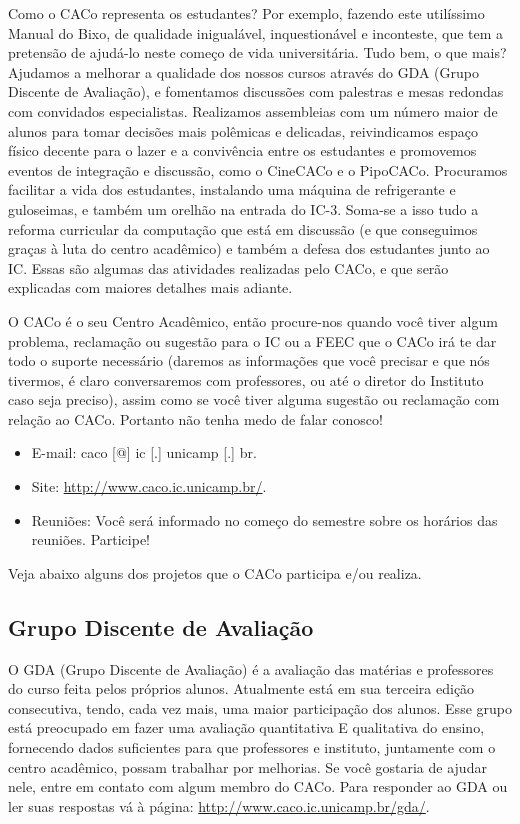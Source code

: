 Como o CACo representa os estudantes? Por exemplo, fazendo este utilíssimo
Manual do Bixo, de qualidade inigualável, inquestionável e inconteste, que tem
a pretensão de ajudá-lo neste começo de vida universitária. Tudo bem, o que
mais? Ajudamos a melhorar a qualidade dos nossos cursos através do GDA (Grupo
Discente de Avaliação), e fomentamos discussões com palestras e mesas redondas
com convidados especialistas. Realizamos assembleias com um número maior de
alunos para tomar decisões mais polêmicas e delicadas, reivindicamos espaço
físico decente para o lazer e a convivência entre os estudantes e promovemos
eventos de integração e discussão, como o CineCACo e o PipoCACo. Procuramos
facilitar a vida dos estudantes, instalando uma máquina de refrigerante
e guloseimas, e também um orelhão na entrada do IC-3. Soma-se a isso tudo
a reforma curricular da computação que está em discussão (e que conseguimos
graças à luta do centro acadêmico) e também a defesa dos estudantes junto ao IC.
Essas são algumas das atividades realizadas pelo CACo, e que serão explicadas
com maiores detalhes mais adiante.

O CACo é o seu Centro Acadêmico, então procure-nos quando você tiver algum
problema, reclamação ou sugestão para o IC ou a FEEC que o CACo irá te dar todo
o suporte necessário (daremos as informações que você precisar  e que nós
tivermos, é claro  conversaremos com professores, ou até o diretor do Instituto
caso seja preciso), assim como se você tiver alguma sugestão ou reclamação com
relação ao CACo. Portanto não tenha medo de falar conosco!

\begin{itemize}
\item  E-mail: caco [@] ic [.] unicamp [.] br.
\item  Site: \url{http://www.caco.ic.unicamp.br/}.
\item  Reuniões: Você será informado no começo do semestre sobre os horários das reuniões. Participe!
\end{itemize}

Veja abaixo alguns dos projetos que o CACo participa e/ou realiza.

\subsection{Grupo Discente de Avaliação}

O GDA (Grupo Discente de Avaliação) é a avaliação das matérias e professores
do curso feita pelos próprios alunos. Atualmente está em sua terceira edição
consecutiva, tendo, cada vez mais, uma maior participação dos alunos. Esse grupo
está preocupado em fazer uma avaliação quantitativa E qualitativa do ensino,
fornecendo dados suficientes para que professores e instituto, juntamente com o
centro acadêmico, possam trabalhar por melhorias. Se você gostaria de ajudar
nele, entre em contato com algum membro do CACo. Para responder ao GDA ou ler
suas respostas vá à página: \url{http://www.caco.ic.unicamp.br/gda/}.

